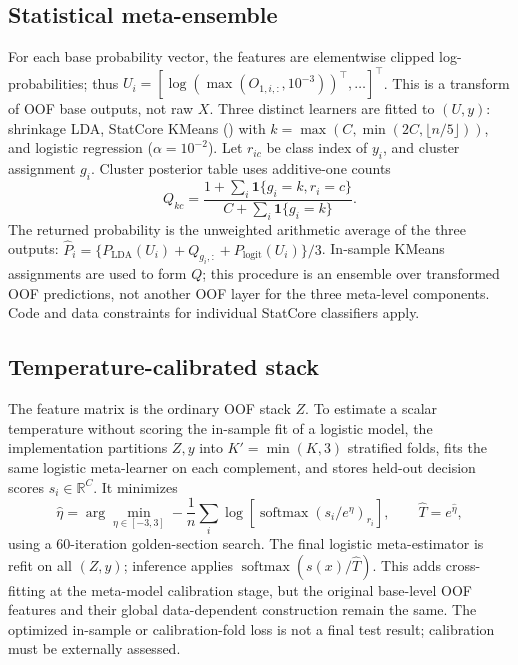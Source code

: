 ﻿\documentclass[conference]{IEEEtran}
\begin{document}
\subsection{Statistical meta-ensemble}
For each base probability vector, the features are elementwise clipped log-probabilities; thus \(U_i=[\log(\max(O_{1,i,:},10^{-3}))^\top,\ldots]^\top\). This is a transform of OOF base outputs, not raw \(X\). Three distinct learners are fitted to \((U,y)\): shrinkage LDA, StatCore KMeans () with \(k=\max(C,\min(2C,\lfloor n/5\rfloor))\), and logistic regression (\(\alpha=10^{-2}\)). Let \(r_{ic}\) be class index of \(y_i\), and cluster assignment \(g_i\). Cluster posterior table uses additive-one counts
\[
Q_{kc}=\frac{1+\sum_i\mathbf1\{g_i=k,r_i=c\}}{C+\sum_i\mathbf1\{g_i=k\}}.
\]
The returned probability is the unweighted arithmetic average of the three outputs: \(\hat P_i=\{P_{\mathrm{LDA}}(U_i)+Q_{g_i,:}+P_{\mathrm{logit}}(U_i)\}/3\). In-sample KMeans assignments are used to form \(Q\); this procedure is an ensemble over transformed OOF predictions, not another OOF layer for the three meta-level components. Code and data constraints for individual StatCore classifiers apply.

\subsection{Temperature-calibrated stack}
The feature matrix is the ordinary OOF stack \(Z\). To estimate a scalar temperature without scoring the in-sample fit of a logistic model, the implementation partitions \(Z,y\) into \(K'=\min(K,3)\) stratified folds, fits the same logistic meta-learner on each complement, and stores held-out decision scores \(s_i\in\mathbb R^C\). It minimizes
\[
\hat\eta=\arg\min_{\eta\in[-3,3]} -\frac1n\sum_i\log\left[\operatorname{softmax}(s_i/e^\eta)_{r_i}\right],\qquad \hat T=e^{\hat\eta},
\]
using a 60-iteration golden-section search. The final logistic meta-estimator is refit on all \((Z,y)\); inference applies \(\operatorname{softmax}(s(x)/\hat T)\). This adds cross-fitting at the meta-model calibration stage, but the original base-level OOF features and their global data-dependent construction remain the same. The optimized in-sample or calibration-fold loss is not a final test result; calibration must be externally assessed.
\end{document}
